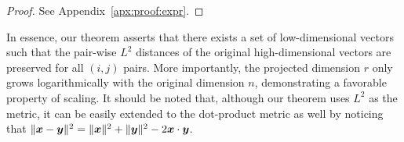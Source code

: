 \begin{proof}
See Appendix~\ref{apx:proof:expr}.
\end{proof}

In essence, our theorem asserts that there exists a set of low-dimensional vectors such that the pair-wise $L^2$ distances of the original high-dimensional vectors are preserved for all $(i, j)$ pairs. More importantly, the projected dimension $r$ only grows logarithmically  with the original dimension $n$, demonstrating a favorable property of scaling. It should be noted that, although our theorem uses $L^2$ as the metric, it can be easily extended to the dot-product metric as well by noticing that $\|{\bm{x}} - {\bm{y}}\|^2 =   \|{\bm{x}}\|^2 + \|{\bm{y}}\|^2 - 2 {\bm{x}} \cdot {\bm{y}}$. 




    

    
